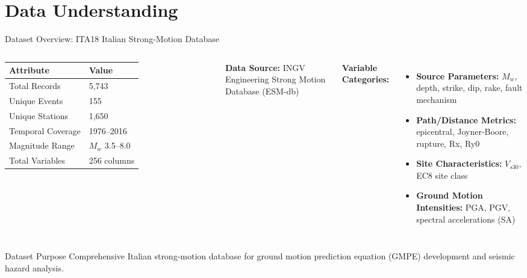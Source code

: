 \documentclass[aspectratio=169,11pt]{beamer}
\begin{document}
\section{Data Understanding}

\begin{frame}{Dataset Overview: ITA18 Italian Strong-Motion Database}
\begin{columns}[T]
\begin{table}
\centering
\small
\begin{tabular}{@{}ll@{}}
\toprule
\textbf{Attribute} & \textbf{Value} \\
\midrule
Total Records & 5,743 \\
Unique Events & 155 \\
Unique Stations & 1,650 \\
Temporal Coverage & 1976--2016 \\
Magnitude Range & $M_w$ 3.5--8.0 \\
Total Variables & 256 columns \\
\bottomrule
\end{tabular}
\end{table}

\vspace{0.2cm}
\textbf{Data Source:} INGV Engineering Strong Motion Database (ESM-db)

\textbf{Variable Categories:}
\begin{itemize}
    \item \textbf{Source Parameters:} $M_w$, depth, strike, dip, rake, fault mechanism
    \item \textbf{Path/Distance Metrics:} epicentral, Joyner-Boore, rupture, Rx, Ry0
    \item \textbf{Site Characteristics:} $V_{s30}$, EC8 site class
    \item \textbf{Ground Motion Intensities:} PGA, PGV, spectral accelerations (SA)
\end{itemize}
\end{columns}

\vspace{0.3cm}
\begin{block}{Dataset Purpose}
Comprehensive Italian strong-motion database for ground motion prediction equation (GMPE) development and seismic hazard analysis.
\end{block}
\end{frame}
\end{document}
